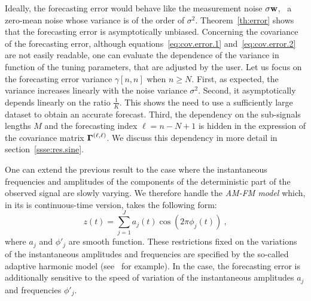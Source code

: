 Ideally, the forecasting error would behave like the measurement noise $\sigma{\mathbf w}$, \ie~a zero-mean noise whose variance is of the order of $\sigma^2$. Theorem~\ref{th:error} shows that the forecasting error is asymptotically unbiased. Concerning the covariance of the forecasting error, although equations~\eqref{eq:cov.error.1} and~\eqref{eq:cov.error.2} are not easily readable, one can evaluate the dependence of the variance in function of the tuning parameters, that are adjusted by the user. Let us focus on the forecasting error variance $\gamma[n,n]$ when $n\geq N$. First, as expected, the variance increases linearly with the noise variance $\sigma^2$. Second, it asymptotically depends linearly on the ratio $\frac{1}{K}$. This shows the need to use a sufficiently large dataset to obtain an accurate forecast. Third, the dependency on the sub-signals lengths $M$ and the forecasting index $\ell=n-N+1$ is hidden in the expression of the covariance matrix $\boldsymbol{\Gamma}^{(\ell,\ell)}$. We discuss this dependency in more detail in section~\ref{ssse:res.sine}.

\begin{remark}[AM-FM Model]
One can extend the previous result to the case where the instantaneous frequencies and amplitudes of the components of the deterministic part of the observed signal are slowly varying. We therefore handle the \textit{AM-FM model} which, in its is continuous-time version, takes the following form:
\begin{equation}
z(t) = \sum_{j=1}^J a_j(t)\cos(2\pi\phi_j(t))\ ,
\end{equation}
where $a_j$ and $\phi'_j$ are smooth function. These 
restrictions fixed on the variations of the instantaneous amplitudes and frequencies are specified by the so-called adaptive harmonic model (see~\cite{Daubechies16conceft} for example). In the case, the forecasting error is additionally sensitive to the speed of variation of the instantaneous amplitudes $a_j$ and frequencies $\phi'_j$. 
\end{remark}


